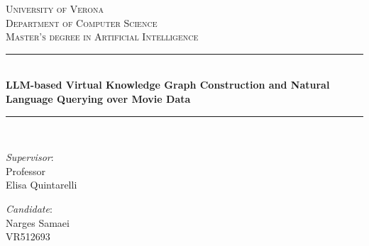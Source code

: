 \documentclass[a4paper,11pt]{report}
\begin{document}
\begin{titlepage}
\newcommand{\HRule}{\rule{\linewidth}{0.5mm}} %
\setlength{\topmargin}{0in}
\center


\textsc{\huge University of Verona}\\[0.2cm] %
\textsc{\large Department of Computer Science}\\[0.1cm] %
\textsc{\large Master's degree in Artificial Intelligence}\\[4cm]

\HRule \\[0.5cm]
{ \LARGE \bfseries LLM-based Virtual Knowledge Graph Construction and Natural Language Querying over Movie Data}


\HRule \\[3.5cm]


\begin{minipage}[t]{0.49\textwidth}
	{\large{\textit{Supervisor}:\\ Professor\\ Elisa Quintarelli}}
	
    
    \vspace{0.5cm}
	
\end{minipage}\hfill\begin{minipage}[t]{0.47\textwidth}\raggedleft
  {\large{\textit{Candidate}:\\ Narges Samaei\\ VR512693 \\ }}
  \vspace{40mm}
\end{minipage}
\end{titlepage}
\end{document}
